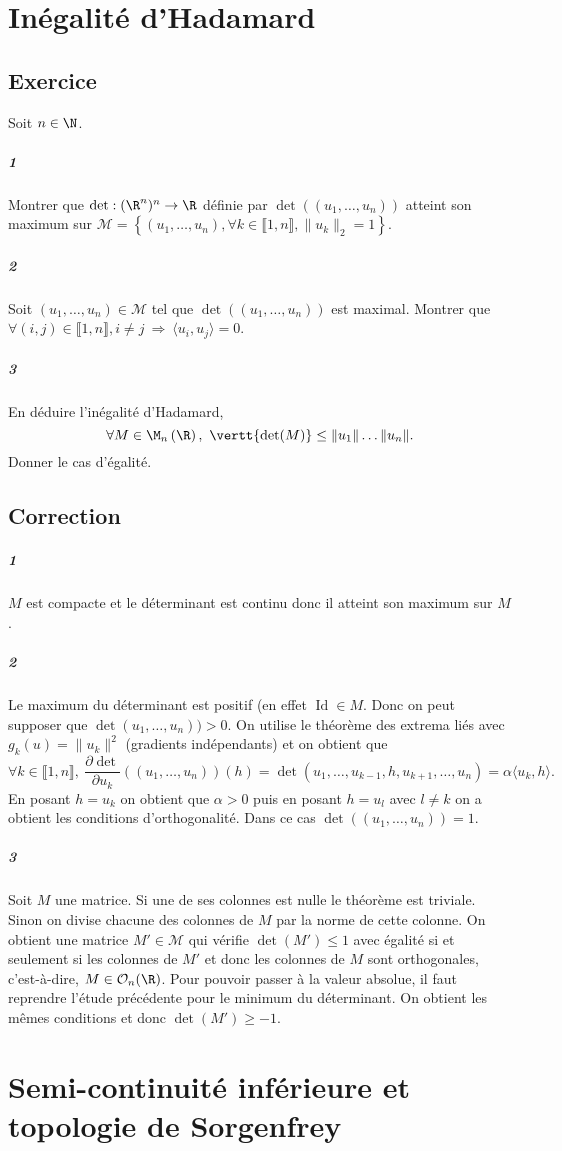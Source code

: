 \documentclass[10pt,a4paper]{article} 
\begin{document}
\section{Inégalité d'Hadamard}
\subsection{Exercice}
Soit $n \in \N$.
\subparagraph{1} Montrer que $\det : (\R^n)^n \rightarrow \R$ définie par $\det((u_1,\dots,u_n))$ atteint son maximum sur $\mathcal{M} = \left\lbrace (u_1,\dots,u_n), \forall k \in \llbracket 1,n \rrbracket, \|u_k\|_2 = 1 \right\rbrace$.
\subparagraph{2} Soit $(u_1,\dots,u_n) \in \mathcal{M}$ tel que $\det((u_1, \dots,u_n))$ est maximal. Montrer que $\forall (i,j) \in \llbracket 1,n \rrbracket, i \neq j \ \Rightarrow \ \langle u_i,u_j \rangle = 0$.
\subparagraph{3} En déduire l'inégalité d'Hadamard,
\[\forall M \in \M_n\left(\R\right), \ \vertt{\det(M)} \le \|u_1\| \dots \|u_n\|.\]
Donner le cas d'égalité.
\subsection{Correction}
\subparagraph{1} $M$ est compacte et le déterminant est continu donc il atteint son maximum sur $M$.
\subparagraph{2} Le maximum du déterminant est positif (en effet $\operatorname{Id} \in M$. Donc on peut supposer que $\det(u_1,\dots,u_n)) >0$. On utilise le théorème des extrema liés avec $g_k(u) = \|u_k\|^2$ (gradients indépendants) et on obtient que
\[ \forall k \in \llbracket 1,n \rrbracket, \ \frac{\partial \det}{\partial u_k}((u_1,\dots,u_n))(h) = \det(u_1,\dots,u_{k-1},h,u_{k+1},\dots,u_n) = \alpha \langle u_k,h\rangle.\]
En posant $h = u_k$ on obtient que $\alpha >0$ puis en posant $h = u_l$ avec $l \neq k$ on a obtient les conditions d'orthogonalité. Dans ce cas $\det((u_1,\dots,u_n)) = 1$.
\subparagraph{3} Soit $M$ une matrice. Si une de ses colonnes est nulle le théorème est triviale. Sinon on divise chacune des colonnes de $M$ par la norme de cette colonne. On obtient une matrice $M' \in \mathcal{M}$ qui vérifie $\det(M') \le 1$ avec égalité si et seulement si les colonnes de $M'$ et donc les colonnes de $M$ sont orthogonales, c'est-à-dire, $M \in \mathcal{O}_n(\R)$. Pour pouvoir passer à la valeur absolue, il faut reprendre l'étude précédente pour le minimum du déterminant. On obtient les mêmes conditions et donc $\det(M') \ge -1$.
\section{Semi-continuité inférieure et topologie de Sorgenfrey}
\end{document}
